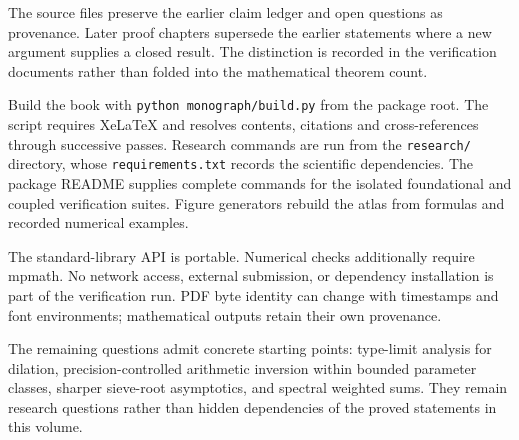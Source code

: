 The source files preserve the earlier claim ledger and open questions as provenance. Later proof chapters supersede the earlier statements where a new argument supplies a closed result. The distinction is recorded in the verification documents rather than folded into the mathematical theorem count.

Build the book with \texttt{python monograph/build.py} from the package root.
The script requires XeLaTeX and resolves contents, citations and cross-references
through successive passes. Research commands are run from the
\texttt{research/} directory, whose \texttt{requirements.txt} records the
scientific dependencies. The package README supplies complete commands for
the isolated foundational and coupled verification suites. Figure generators
rebuild the atlas from formulas and recorded numerical examples.

The standard-library API is portable. Numerical checks additionally require
mpmath. No network access, external submission, or dependency installation is
part of the verification run. PDF byte identity can change with timestamps
and font environments; mathematical outputs retain their own provenance.

The remaining questions admit concrete starting points: type-limit analysis
for dilation, precision-controlled arithmetic inversion within bounded
parameter classes, sharper sieve-root asymptotics, and spectral weighted sums.
They remain research questions rather than hidden dependencies of the
proved statements in this volume.
